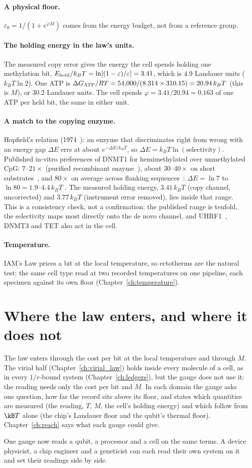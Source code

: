 \paragraph{A physical floor.} $\varepsilon_0=1/(1+e^{\varphi M})$ comes from the energy budget, not from a reference group.
\paragraph{The holding energy in the law's units.} The measured copy error gives the energy the cell spends holding one methylation bit,
$E_{\rm hold}/k_BT=\ln[(1-\varepsilon)/\varepsilon]=3.41$, which is $4.9$ Landauer units ($k_BT\ln2$). One ATP is $\Delta G_{\rm ATP}/RT=
54{,}000/(8.314\times310.15)=20.94\,k_BT$ (this is $M$), or $30.2$ Landauer units. The cell spends $\varphi=3.41/20.94=0.163$ of one ATP per held
bit, the same in either unit.
\paragraph{A match to the copying enzyme.} Hopfield's relation (1974~\cite{Hopfield1974}): an enzyme that discriminates right from wrong with an energy gap $\Delta E$
errs at about $e^{-\Delta E/k_BT}$, so $\Delta E=k_BT\ln(\text{selectivity})$. Published in-vitro preferences of DNMT1 for hemimethylated over
unmethylated CpG: $7$--$21\times$ (purified recombinant enzyme~\cite{Pradhan1999}), about $30$--$40\times$ on short substrates~\cite{Goyal2006}, and $80\times$ on average across
flanking sequences~\cite{Adam2023}:
$\Delta E=\ln7$ to $\ln80=1.9$--$4.4\,k_BT$ \observed. The measured holding energy, $3.41\,k_BT$ (copy channel, uncorrected) and $3.77\,k_BT$ (instrument error
removed), lies inside that range. This is a consistency check, not a confirmation: the published range is tenfold, the selectivity maps most
directly onto the de novo channel, and UHRF1~\cite{Bostick2007,Sharif2007}, DNMT3 and TET also act in the cell.
\paragraph{Temperature.}\label{sec:og_temperature} IAM's Law prices a bit at the local temperature, so ectotherms are the natural test: the same cell type read at two recorded
temperatures on one pipeline, each specimen against its own floor (Chapter~\ref{ch:temperature}). \prediction

\section{Where the law enters, and where it does not}
The law enters through the cost per bit at the local temperature and through $M$. The virial half (Chapter~\ref{ch:virial_law}) holds inside every
molecule of a cell, as in every $1/r$-bound system (Chapter~\ref{ch:ledgers}), but the gauge does not use it: the reading needs only the cost per bit and
$M$. In each domain the gauge asks one question, how far the record sits above its floor, and states which quantities are measured (the reading,
$T$, $M$, the cell's holding energy) and which follow from $\kB T$ alone (the chip's Landauer floor and the qubit's thermal floor). Chapter~\ref{ch:reach} says what each gauge could give.

One gauge now reads a qubit, a processor and a cell on the same terms. A device physicist, a chip engineer and a geneticist can each read their own system on it and set their readings side by side.
